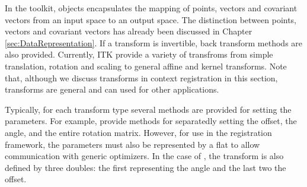 In the toolkit,  objects encapsulates the mapping of
points, vectors and covariant vectors from an input space to an output space.
The distinction between points, vectors and covariant vectors has already
been discussed in Chapter \ref{sec:DataRepresentation}. If a transform is
invertible, back transform methods are also provided. Currently, 
ITK provide a variety of transfroms from simple translation, rotation and 
scaling to general affine and kernel transforms. Note that, although we
discuss transforms in context registration in this section, transforms
are general and can used for other applications.

Typically, for each transform type several methods are provided for setting
the parameters. For example,  provide methods for
separatedly setting the offset, the angle, and the entire rotation matrix.
However, for use in the registration framework, the parameters must also
be represented by a flat  to allow communication
with generic optimizers. In the case of , the transform
is also defined by three doubles: the first representing the angle and 
the last two the offset.

